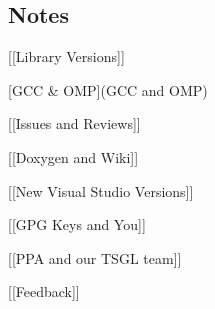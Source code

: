 \subsection*{Notes}


\begin{DoxyItemize}
\item \mbox{[}\mbox{[}Library Versions\mbox{]}\mbox{]}
\item \mbox{[}G\-C\-C \& O\-M\-P\mbox{]}(G\-C\-C and O\-M\-P)
\item \mbox{[}\mbox{[}Issues and Reviews\mbox{]}\mbox{]}
\item \mbox{[}\mbox{[}Doxygen and Wiki\mbox{]}\mbox{]}
\item \mbox{[}\mbox{[}New Visual Studio Versions\mbox{]}\mbox{]}
\item \mbox{[}\mbox{[}G\-P\-G Keys and You\mbox{]}\mbox{]}
\item \mbox{[}\mbox{[}P\-P\-A and our T\-S\-G\-L team\mbox{]}\mbox{]}
\item \mbox{[}\mbox{[}Feedback\mbox{]}\mbox{]} 
\end{DoxyItemize}